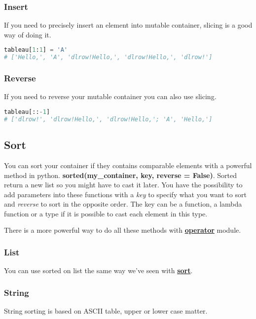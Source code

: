 \documentclass[a4paper, 12pt, titlepage]{scrartcl} %
\begin{document}
\subsubsection{Insert}  
If you need to precisely insert an element into mutable container, slicing is a good way of doing it.
\begin{lstlisting}[language=Python]
tableau[1:1] = 'A'
# ['Hello,', 'A', 'dlrow!Hello,', 'dlrow!Hello,', 'dlrow!']
\end{lstlisting} \vspace{5mm}

\subsubsection{Reverse} 
If you need to reverse your mutable container you can also use slicing.
\begin{lstlisting}[language=Python]
tableau[::-1]
# ['dlrow!', 'dlrow!Hello,', 'dlrow!Hello,'; 'A', 'Hello,']
\end{lstlisting} \vspace{5mm}

\subsection{Sort}
You can sort your container if they contains comparable elements with a powerful method in python. \textbf{sorted(my\_container, key, reverse = False)}. Sorted return a new list so you might have to cast it later. You have the possibility to add parameters into these functions with a \textit{key} to specify what you want to sort and \textit{reverse} to sort in the opposite order. The key can be a function, a lambda function or a type if it is possible to cast each element in this type.

\vspace{5mm}

There is a more powerful way to do all these methods with \hyperref[subsec:Operator]{\textbf{operator}} module.

\subsubsection{List}
You can use sorted on list the same way we've seen with \hyperref[Sort]{\textbf{sort}}.

\subsubsection{String}
String sorting is based on ASCII table, upper or lower case matter.
\end{document}
